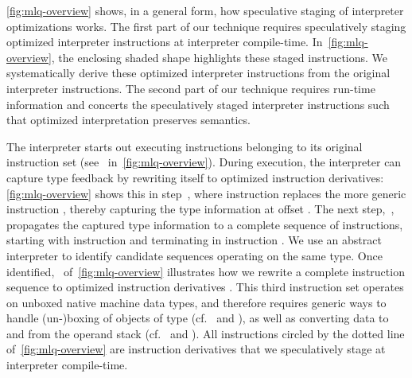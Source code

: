 \documentclass[preprint,10pt]{popl14conf}
\begin{document}
\autoref{fig:mlq-overview} shows, in a general form, how speculative staging of interpreter
optimizations works.
The first part of our technique requires speculatively staging optimized interpreter instructions at
interpreter compile-time.
In~\autoref{fig:mlq-overview}, the enclosing shaded shape highlights these staged instructions.
We systematically derive these optimized interpreter instructions from the original interpreter
instructions.
The second part of our technique requires run-time information and concerts the speculatively staged
interpreter instructions such that optimized interpretation preserves semantics.

The interpreter starts out executing instructions belonging to its original instruction set
(see~ in~\autoref{fig:mlq-overview}).
During execution, the interpreter can capture type feedback by rewriting itself to optimized
instruction derivatives:
\autoref{fig:mlq-overview} shows this in step~, where instruction 
replaces the more generic instruction , thereby capturing the type information  at
offset .
The next step,~,  propagates the captured type information  to a complete
sequence of instructions, starting with instruction  and terminating in instruction .
We use an abstract interpreter to identify candidate sequences operating on the same type.
Once identified,~ of~\autoref{fig:mlq-overview} illustrates how we rewrite a
complete instruction sequence  to optimized instruction derivatives .
This third instruction set operates on unboxed native machine data types, and therefore requires
generic ways to handle (un-)boxing of objects of type  (cf.~ and
), as well as converting data to and from the operand stack
(cf.~ and ).
All instructions circled by the dotted line of~\autoref{fig:mlq-overview} are instruction
derivatives that we speculatively stage at interpreter compile-time.
\end{document}
